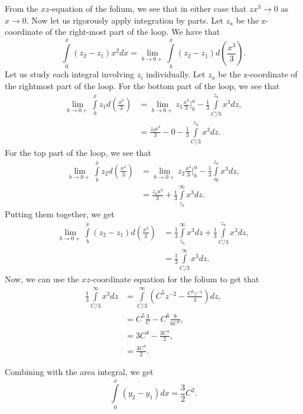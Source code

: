 \begin{enumerate}
From the \(xz\)-equation of the folium, we see that in either case that \(zx^3 \to 0\) as \(x \to 0\). Now let us rigorously apply integration by parts.
Let \(z_a\) be the z-coordinate of the right-most part of the loop.
We have that
\begin{equation}
\int\limits_0^{\bar x} (z_2 - z_1) x^2 dx = \lim\limits_{b \to 0+} \int\limits_b^{\bar x} (z_2 - z_1) d \left(\frac{x^3}{3}\right).
\end{equation}
Let us study each integral involving \(z_i\) individually. Let \(z_a\) be the z-coordinate of the rightmost part of the loop. For the bottom part of the loop, we see that
\begin{align}
\lim\limits_{b \to 0+} \int\limits_b^{\bar x} z_1 d\left(\frac{x^3}{3}\right) & =  \lim\limits_{b \to 0+} z_1\frac{x^3}{3} \big|_b^a -\frac{1}{3} \int\limits_{C/3}^{z_a} x^3 dz, \\
    & = \frac{z_b a^3}{3} - 0 - \frac{1}{3} \int\limits_{C/3}^{z_a} x^3 dz. 
\end{align}
For the top part of the loop, we see that
\begin{align}
\lim\limits_{b \to 0+} \int\limits_b^{\bar x} z_2 d\left(\frac{x^3}{3}\right) & = \lim\limits_{b \to 0+} z_2\frac{x^3}{3} \big|_b^a - \frac{1}{3} \int\limits_{\infty}^{z_a} x^3 dz, \\
    & = \frac{z_a a^3}{3} + \frac{1}{3} \int\limits_{z_a}^\infty x^3 dz. 
\end{align}
Putting them together, we get
\begin{align}
\lim\limits_{b \to 0+} \int\limits_b^{\bar x} (z_2 - z_1) d \left(\frac{x^3}{3}\right) & =  \frac{1}{3} \int\limits_{z_a}^\infty x^3 dz + \frac{1}{3} \int\limits_{C/3}^{z_a} x^3 dz, \\ 
    & = \frac{1}{3} \int\limits_{C/3}^\infty x^3 dz. 
\end{align}
Now, we can use the \(xz\)-coordinate equation for the folium to get that
\begin{align}
\frac{1}{3} \int\limits_{C/3}^\infty x^3 dz & = \int\limits_{C/3}^\infty \left( C^5 z^{-2} - \frac{C^6 z^{-3}}{3} \right) dz, \\
    & = C^5 \frac{3}{C} - C^6\frac{9}{6C^2}, \\
    & = 3C^4 - \frac{3C^4}{2}, \\
    & = \frac{3C^4}{2}. 
\end{align}

Combining with the area integral, we get
\begin{equation}
\int\limits_0^{\bar x} (y_2 - y_1) dx = \frac{3}{2}C^2.
\end{equation}
\end{enumerate}
